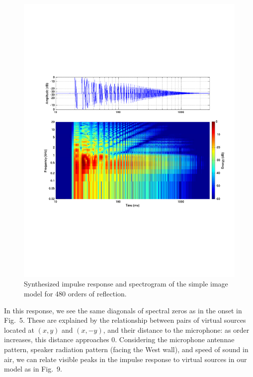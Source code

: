 \documentclass{aes137}
\begin{document}
\begin{figure}[h!] \centering \includegraphics[width=\linewidth]{images/IM_480c00_irsg_cropped.pdf} \caption{Synthesized impulse response and spectrogram of the simple image model for 480 orders of reflection.} \end{figure}

In this response, we see the same diagonals of spectral zeros as in the onset in Fig.~5. These are explained by the relationship between pairs of virtual sources located at $(x,y)$ and $(x,-y)$, and their distance to the microphone: as order increases, this distance approaches 0. Considering the
microphone antennae pattern, speaker radiation pattern (facing the
West wall), and speed of sound in air, we can relate visible peaks in
the impulse response to virtual sources in our model as in Fig.~9.
\end{document}

